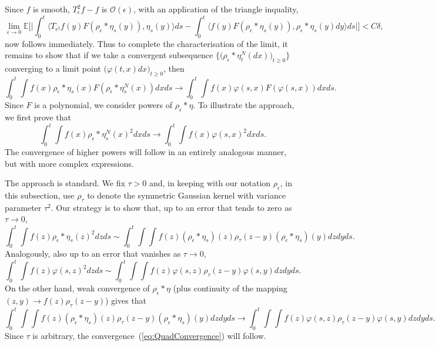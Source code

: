 \documentclass[EJP]{ejpecp} %
\newcommand{\IE}{\mathbb E}
\begin{document}

Since $f$ is smooth, $T_\epsilon^2f-f$ is ${\mathcal O}(\epsilon)$, 
with an application of the triangle inquality, 
\[
\lim_{\epsilon\to 0}\IE\Big[\Big|\int_0^t\big\langle T_{\epsilon^2} f(y) 
F(\rho_\epsilon *\eta_s(y)), \eta_s(y) \big\rangle ds 
- \int_0^t\big\langle f(y) 
F(\rho_\epsilon * \eta_s(y)), \rho_\epsilon * \eta_s(y) dy 
\big\rangle ds\Big|\Big]
<C\delta,
\]
now follows immediately.
Thus to complete the characterisation of the limit, 
it remains to show that if we
take a convergent subsequence 
$\big\{\big(\rho_\epsilon*\eta_t^N(dx)\big)_{t\geq 0}\big\}$ 
converging to a limit point $\big(\varphi(t,x)dx\big)_{t\geq 0}$, then
\[ 
\int_0^t
\int f(x) \rho_\epsilon * \eta_s(x) F(\rho_\epsilon * \eta_s^N(x)) dx ds 
\rightarrow \int_0^t\int f(x) \varphi(s,x) F(\varphi(s,x)) dx ds. 
\]
Since $F$ is a polynomial, we consider powers of $\rho_\epsilon*\eta$.
To illustrate the approach, we first prove that
\begin{equation} 
\label{eq:QuadConvergence} 
\int_0^t\int f(x) 
\rho_\epsilon * \eta_s^N(x)^2 dx ds
\rightarrow \int_0^t \int f(x) 
\varphi(s,x)^2 dx ds. 
\end{equation}
The convergence of higher powers will follow in an entirely analogous manner, but
with more complex expressions.

The approach is standard. We fix $\tau>0$ and, in keeping with
our notation $\rho_\epsilon$, in this subsection, use $\rho_\tau$ to 
denote the symmetric Gaussian kernel with variance parameter $\tau^2$.
Our strategy is to show that, up to an error that tends
to zero as $\tau \to 0$, 
\begin{equation}
\label{approx2}
\int_0^t\int f(z) \rho_\epsilon*\eta_s(z)^2 dz ds
\sim 
\int_0^t\int \int f(z) (\rho_\epsilon * \eta_s)(z) 
\rho_\tau (z-y) (\rho_\epsilon * \eta_s)(y) dz dy ds.
\end{equation}
Analogously, also up to an error that vanishes as $\tau \to 0$,
\begin{equation}
\label{approx3}
\int_0^t\int f(z) \varphi(s,z)^2 dz ds
\sim 
\int_0^t\int \int f(z) \varphi(s,z) 
\rho_\tau (z-y) \varphi(s,y) dz dy ds.
\end{equation}
On the other hand,
weak convergence of $\rho_\epsilon * \eta$ 
(plus continuity of the mapping $(z,y) \rightarrow f(z) \rho_\tau(z-y)$) 
gives that 
\begin{equation}
\int_0^t\int \int f(z) (\rho_\epsilon * \eta_s)(z) 
\rho_\tau (z-y) (\rho_\epsilon * \eta_s)(y) dz dy ds
\to \int_0^t \int \int f(z) \varphi(s,z) 
\rho_\tau (z-y) \varphi(s,y) dz dy ds.
\end{equation}
Since $\tau$ is arbitrary, the 
convergence~(\ref{eq:QuadConvergence})
will follow.
\end{document}
